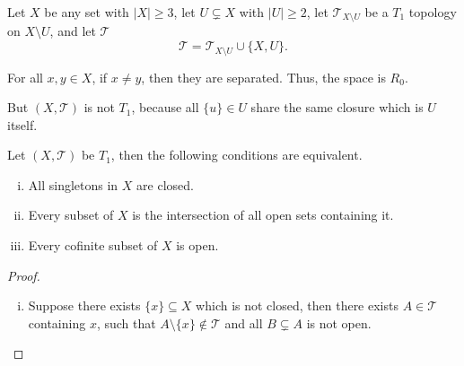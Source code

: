 \begin{example}
	\label{eg: R_0 but not T_1}
	
	Let $X$ be any set with $|X| \ge 3$, let $U \subsetneq X$ with $|U| \ge 2$, let $\mathcal T_{X \setminus U}$ be a $T_1$ topology on $X \setminus U$, and let $\mathcal T$
	$$
	\mathcal T = \mathcal T_{X \setminus U} \cup \{X, U\}.
	$$
	
	For all $x,y \in X$, if $x \ne y$, then they are separated. Thus, the space is $R_0$.
	
	But $(X, \mathcal T)$ is not $T_1$, because all $\{u\} \in U$ share the same closure which is $U$ itself.
\end{example}


\begin{proposition}
	\label{prop: alternative definitions of T_1 spaces}
	Let $(X, \mathcal T)$ be $T_1$, then the following conditions are equivalent.
	\begin{enumerate}[(i)]
		\item All singletons in $X$ are closed.
		\item Every subset of $X$ is the intersection of all open sets containing it.
		\item Every cofinite subset of $X$ is open.
	\end{enumerate}
	
	\begin{proof} \
		\begin{enumerate}[(i)]
			\item
			Suppose there exists $\{x\} \subseteq X$ which is not closed, then there exists $A \in \mathcal T$ containing $x$, such that $A \setminus \{x\} \notin \mathcal T$ and all $B \subsetneq A$ is not open.
			
			
		\end{enumerate}
	\end{proof}
\end{proposition}


